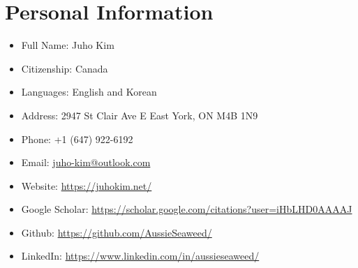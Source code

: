 \documentclass{article}
\begin{document}
	\section*{Personal Information}

	\begin{itemize}[noitemsep]
		\item Full Name: Juho Kim
		\item Citizenship: Canada
		\item Languages: English and Korean
		\item Address: 2947 St Clair Ave E East York, ON M4B 1N9
		\item Phone: +1 (647) 922-6192
		\item Email: \href{mailto:juho-kim@outlook.com}{juho-kim@outlook.com}
		\item Website: \url{https://juhokim.net/}
		\item Google Scholar: \url{https://scholar.google.com/citations?user=iHbLHD0AAAAJ}
		\item Github: \url{https://github.com/AussieSeaweed/}
		\item LinkedIn: \url{https://www.linkedin.com/in/aussieseaweed/}
		\iftoggle{verbose}{
			\item YouTube: \url{https://www.youtube.com/@AussieSeaweed}
		}{}
	\end{itemize}
\end{document}

